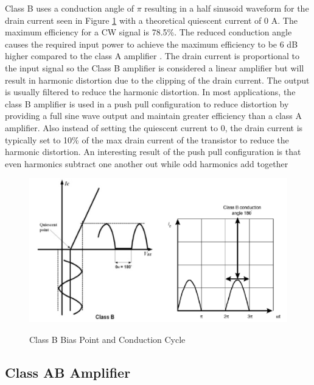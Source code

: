 Class B uses a conduction angle of $\pi$ resulting in a half sinusoid waveform for the drain current seen in Figure \ref{classb_bias} with a theoretical quiescent current of 0 A. The maximum efficiency for a CW signal is 78.5\%. The reduced conduction angle causes the required input power to achieve the maximum efficiency to be 6 dB higher compared to the class A amplifier \cite{C.Cripps2006}.
The drain current is proportional to the input signal so the Class B amplifier is considered a linear amplifier but will result in harmonic distortion due to the clipping of the drain current. The output is usually filtered to reduce the harmonic distortion\cite{Raab2003}.
In most applications, the class B amplifier is used in a push pull configuration to reduce distortion by providing a full sine wave output and maintain greater efficiency than a class A amplifier. Also instead of setting the quiescent current to 0, the drain current is typically set to 10\% of the max drain current of the transistor to reduce the harmonic distortion. An interesting result of the push pull configuration is that even harmonics subtract one another out while odd harmonics add together \cite{Rosu2001}

\begin{figure}
  \centering
  \includegraphics[width=6in]{figures/classes/classb_bias}\\
  \caption{Class B Bias Point and Conduction Cycle \cite{Rosu2001}}\label{classb_bias}
\end{figure}


\subsection{Class AB Amplifier}

